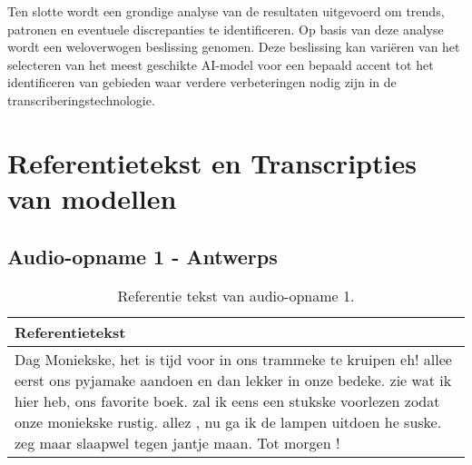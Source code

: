 Ten slotte wordt een grondige analyse van de resultaten uitgevoerd om trends, patronen en eventuele discrepanties te identificeren. Op basis van deze analyse wordt een weloverwogen beslissing genomen. Deze beslissing kan variëren van het selecteren van het meest geschikte AI-model voor een bepaald accent tot het identificeren van gebieden waar verdere verbeteringen nodig zijn in de transcriberingstechnologie.

\section{Referentietekst en Transcripties van modellen}


\subsection{Audio-opname 1 - Antwerps}

\begin{table}[htbp]
    \centering
    \label{tab:groundtruth_sample1}
    \begin{tabularx}{\textwidth}{|X|}
        \hline
            \textbf{Referentietekst} \\
        \hline
            Dag Moniekske, het is tijd voor in ons trammeke te kruipen eh! allee eerst ons pyjamake aandoen en dan lekker in onze bedeke. zie wat ik hier heb, ons favorite boek. zal ik eens een stukske voorlezen zodat onze moniekske rustig. allez , nu ga ik de lampen uitdoen he suske. zeg maar slaapwel tegen jantje maan. Tot morgen ! \\
        \hline
    \end{tabularx}
    \caption{Referentie tekst van audio-opname 1.} 
\end{table}


